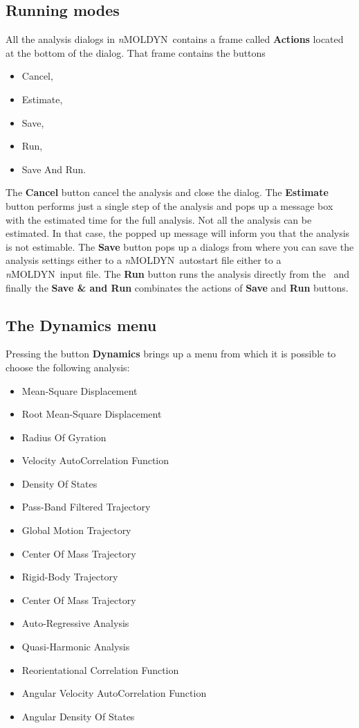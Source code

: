 \documentclass[a4paper,11pt]{report}
\newcommand{\NMOLDYN}{\textit{n}MOLDYN}
\begin{document}
\subsection{Running modes}
\label{running_modes}
All the analysis dialogs in \NMOLDYN\ contains a frame called \textbf{Actions} located at the bottom of the dialog. That 
frame contains the buttons
\begin{itemize}
\item Cancel,
\item Estimate,
\item Save,
\item Run,
\item Save And Run.
\end{itemize}
The \textbf{Cancel} button cancel the analysis and close the dialog. The \textbf{Estimate} button performs just a single step of the 
analysis and pops up a message box with the estimated time for the full analysis. Not all the analysis can be estimated. In that case, the 
popped up message will inform you that the analysis is not estimable. The \textbf{Save} button pops up a 
dialogs from where you can save the analysis settings either to a \NMOLDYN\ autostart file either to a \NMOLDYN\ input file.
The \textbf{Run} button runs the analysis directly from the \GUI\ and finally the \textbf{Save \& and Run} combinates the actions of 
\textbf{Save} and \textbf{Run} buttons.

\subsection{The Dynamics menu}
\label{dynamics_menu}
Pressing the button \textbf{Dynamics} brings up a menu from which it is possible to choose the following analysis:
\begin{itemize}
\item Mean-Square Displacement
\item Root Mean-Square Displacement
\item Radius Of Gyration
\item Velocity AutoCorrelation Function
\item Density Of States
\item Pass-Band Filtered Trajectory
\item Global Motion Trajectory
\item Center Of Mass Trajectory
\item Rigid-Body Trajectory
\item Center Of Mass Trajectory
\item Auto-Regressive Analysis
\item Quasi-Harmonic Analysis
\item Reorientational Correlation Function
\item Angular Velocity AutoCorrelation Function
\item Angular Density Of States
\end{itemize}
\end{document}
